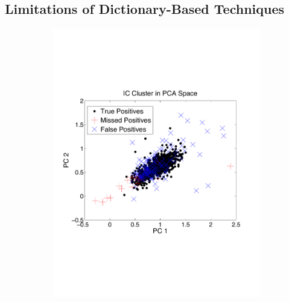 

\subsection{Limitations of Dictionary-Based Techniques} \label{sub:template}
\vspace{-5pt}


\begin{center}
\begin{figure}[h!]
\begin{subfigure}[b]{.33\textwidth}
\includegraphics[width=\textwidth]{../figs/new/ICclusteroldpca.pdf}
\caption{}
\label{fig:ICold}
\end{subfigure}
\begin{subfigure}[b]{.33\textwidth}

\end{subfigure}
\end{figure}
\end{center}
